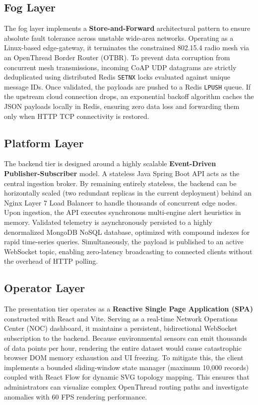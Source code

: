 \documentclass[conference]{IEEEtran}
\begin{document}
\subsection{Fog Layer}
The fog layer implements a \textbf{Store-and-Forward} architectural pattern to ensure absolute fault tolerance across unstable wide-area networks. Operating as a Linux-based edge-gateway, it terminates the constrained 802.15.4 radio mesh via an OpenThread Border Router (OTBR). To prevent data corruption from concurrent mesh transmissions, incoming CoAP UDP datagrams are strictly deduplicated using distributed Redis \texttt{SETNX} locks evaluated against unique message IDs. Once validated, the payloads are pushed to a Redis \texttt{LPUSH} queue. If the upstream cloud connection drops, an exponential backoff algorithm caches the JSON payloads locally in Redis, ensuring zero data loss and forwarding them only when HTTP TCP connectivity is restored.

\subsection{Platform Layer}
The backend tier is designed around a highly scalable \textbf{Event-Driven Publisher-Subscriber} model. A stateless Java Spring Boot API acts as the central ingestion broker. By remaining entirely stateless, the backend can be horizontally scaled (two redundant replicas in the current deployment) behind an Nginx Layer 7 Load Balancer to handle thousands of concurrent edge nodes. Upon ingestion, the API executes synchronous multi-engine alert heuristics in memory. Validated telemetry is asynchronously persisted to a highly denormalized MongoDB NoSQL database, optimized with compound indexes for rapid time-series queries. Simultaneously, the payload is published to an active WebSocket topic, enabling zero-latency broadcasting to connected clients without the overhead of HTTP polling.

\subsection{Operator Layer}
The presentation tier operates as a \textbf{Reactive Single Page Application (SPA)} constructed with React and Vite. Serving as a real-time Network Operations Center (NOC) dashboard, it maintains a persistent, bidirectional WebSocket subscription to the backend. Because environmental sensors can emit thousands of data points per hour, rendering the entire dataset would cause catastrophic browser DOM memory exhaustion and UI freezing. To mitigate this, the client implements a bounded sliding-window state manager (maximum 10,000 records) coupled with React Flow for dynamic SVG topology mapping. This ensures that administrators can visualize complex OpenThread routing paths and investigate anomalies with 60 FPS rendering performance.
\end{document}
